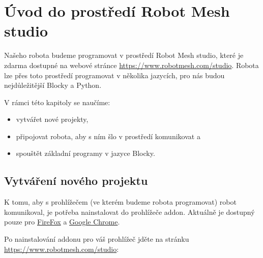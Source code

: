 \documentclass[../main.tex]{subfiles}
\begin{document}
	\section{Úvod do prostředí Robot Mesh studio}

	Našeho robota budeme programovat v prostředí Robot Mesh studio, které je zdarma dostupné na webové stránce \href{https://www.robotmesh.com/studio}{https://www.robotmesh.com/studio}. Robota lze přes toto prostředí programovat v několika jazycích, pro nás budou nejdůležitější Blocky a Python.

	V rámci této kapitoly se naučíme:
	\begin{itemize}
		\item vytvářet nové projekty,
		\item připojovat robota, aby s ním šlo v prostředí komunikovat a
		\item spouštět základní programy v jazyce Blocky.
	\end{itemize}

	\subsection{Vytváření nového projektu}
	K tomu, aby s prohlížečem (ve kterém budeme robota programovat) robot komunikoval, je potřeba nainstalovat do prohlížeče addon. Aktuálně je dostupný pouze pro \href{https://addons.mozilla.org/en-US/firefox/addon/robot-mesh-connect/}{FireFox} a \href{https://chrome.google.com/webstore/detail/robot-mesh-connect-app/mapfkcmnklanficcnnjkgeneakedmjkp}{Google Chrome}.

	Po nainstalování addonu pro váš prohlížeč jděte na stránku \href{https://www.robotmesh.com/studio}{https://www.robotmesh.com/studio}:

	\begin{figure}[h!]
		\centering
	\end{figure}
\end{document}
